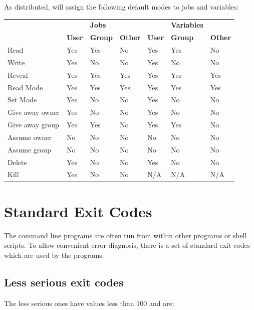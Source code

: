 As distributed, \ProductName{} will assign the following default modes to jobs and variables:
\label{overview:defmodes}
\begin{center}
\begin{tabular}{|lllllll|}\hline
& & \bfseries Jobs& & & \bfseries Variables & \\
&\bfseries User & \bfseries Group & \bfseries Other & \bfseries User & \bfseries Group & \bfseries Other\\\hline
Read & Yes & Yes & No & Yes & Yes & No\\
Write & Yes & No & No & Yes & No & No\\
Reveal & Yes & Yes & Yes & Yes & Yes & Yes\\
Read Mode & Yes & Yes & Yes & Yes & Yes & Yes\\
Set Mode & Yes & No & No & Yes & No & No\\
Give away owner & Yes & No & No & Yes & No & No\\
Give away group & Yes & Yes & No & Yes & Yes & No\\
Assume owner & No & No & No & No & No & No\\
Assume group & No & No & No & No & No & No\\
Delete & Yes & No & No & Yes & No & No\\
Kill & Yes & No & No & N/A & N/A & N/A\\\hline
\end{tabular}
\end{center}
\section{Standard Exit Codes}
The command line programs are often run from within other programs or
shell scripts. To allow convenient error diagnosis, there is a set of
standard exit codes which are used by the \ProductName{} programs.

\subsection{Less serious exit codes}

The less serious ones have values less than 100 and are:

